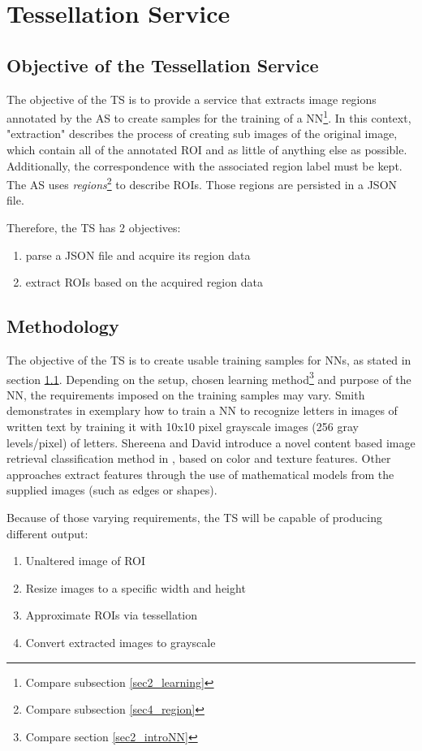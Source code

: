 \chapter{Tessellation Service}

\section{Objective of the Tessellation Service}
\label{sec5_objective}
The objective of the TS is to provide a service that extracts image regions annotated by the AS to create samples for the training of a NN\footnote{
	Compare subsection \ref{sec2_learning}
}. In this context, "extraction" describes the process of creating sub images of the original image, which contain all of the annotated ROI and as little of anything else as possible. Additionally, the correspondence with the associated region label must be kept. The AS uses \emph{regions}\footnote{
	Compare subsection \ref{sec4_region}
} to describe ROIs. Those regions are persisted in a JSON file.

Therefore, the TS has 2 objectives:
\begin{enumerate}[(1)]
	\item parse a JSON file and acquire its region data
	\item extract ROIs based on the acquired region data
\end{enumerate}


\section{Methodology}
\label{sec5_method}
The objective of the TS is to create usable training samples for NNs, as stated in section \ref{sec5_objective}. Depending on the setup, chosen learning method\footnote{
	Compare section \ref{sec2_introNN}
} and purpose of the NN, the requirements imposed on the training samples may vary. Smith demonstrates in \cite{Smith97} exemplary how to train a NN to recognize letters in images of written text by training it with 10x10 pixel grayscale images (256 gray levels/pixel) of letters. Shereena and David introduce a novel content based image retrieval classification method in \cite{Shereena14}, based on color and texture features. Other approaches extract features through the use of mathematical models from the supplied images (such as edges or shapes)\cite{Harvey91}.

Because of those varying requirements, the TS will be capable of producing different output:
\begin{enumerate}[(1)]
	\item Unaltered image of ROI
	\item Resize images to a specific width and height
	\item Approximate ROIs via tessellation
	\item Convert extracted images to grayscale
\end{enumerate}

